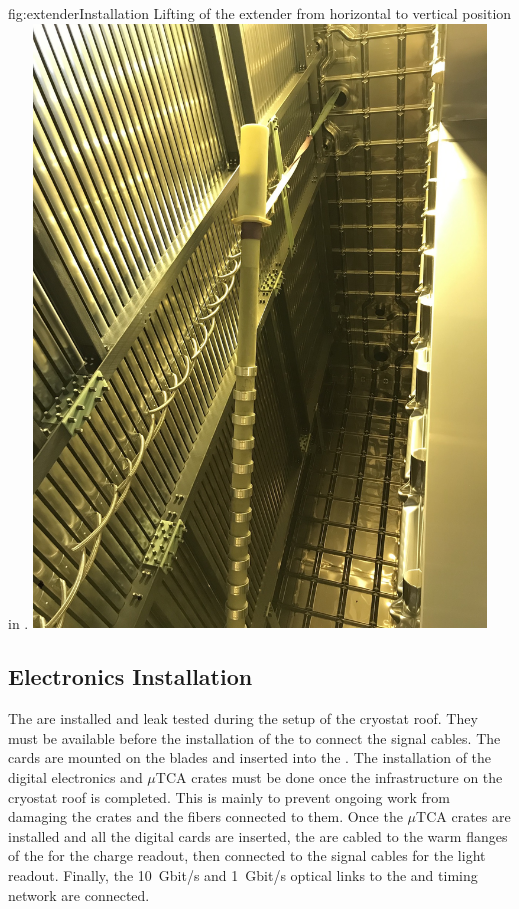 \begin{dunefigure}{fig:extenderInstallation}
{Lifting of the  extender from horizontal to vertical position in  .}
\includegraphics[width=0.9\textwidth]{graphics/extenderInstallation.jpg}
\end{dunefigure}



\subsection{Electronics Installation}
The  are installed and leak tested during the setup of the cryostat roof.
They must be available before the installation of the  to connect the signal cables.
The  cards are mounted on the blades and inserted into the .
The installation of the digital electronics and $\mu$TCA crates must be done once the infrastructure on the cryostat roof is completed.
This is mainly to prevent  ongoing work from damaging the crates and the fibers connected to them.
Once the $\mu$TCA crates are installed and all the digital cards are inserted, the  are cabled to the warm flanges of the  for the charge readout, then connected to the  signal cables for the light readout.
Finally, the 10~Gbit/s and 1~Gbit/s optical links to the  and  timing network are connected.

